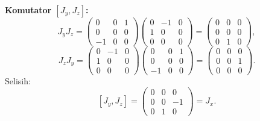 \vspace{0.5em}
\noindent \textbf{Komutator $[J_y, J_z]$:}
\begin{equation}
    J_y J_z = \begin{pmatrix}0&0&1\\0&0&0\\-1&0&0\end{pmatrix}\!\begin{pmatrix}0&-1&0\\1&0&0\\0&0&0\end{pmatrix}
    = \begin{pmatrix}0&0&0\\0&0&0\\0&1&0\end{pmatrix},
\end{equation}
\begin{equation}
    J_z J_y = \begin{pmatrix}0&-1&0\\1&0&0\\0&0&0\end{pmatrix}\!\begin{pmatrix}0&0&1\\0&0&0\\-1&0&0\end{pmatrix}
    = \begin{pmatrix}0&0&0\\0&0&1\\0&0&0\end{pmatrix}.
\end{equation}
Selisih:
\begin{equation}\label{a1-eq:comm-yz}
    [J_y, J_z] = \begin{pmatrix}0&0&0\\0&0&-1\\0&1&0\end{pmatrix} = J_x.
\end{equation}

